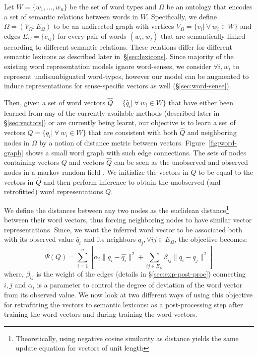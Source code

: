 \documentclass[11pt]{article}
\begin{document}
Let $W = \{w_1,...,w_n\}$ be the set of word types and $\Omega$ be an ontology that encodes a set of semantic relations between words in $W$. 
Specifically, we define $\Omega = (V_\Omega,E_\Omega)$ to be an undirected graph with vertices $V_\Omega = \{v_i | \  \forall \  w_i \in W\}$ and 
edges $E_\Omega = \{e_{ij}\}$ for every pair of words $(w_i,w_j)$ that are semantically linked according to different semantic relations. These relations differ for different semantic lexicons as described later in~\S\ref{sec:lexicons}.
Since majority of the existing word representation models ignore word-senses,
we consider $\forall i, w_i$ to represent undisambiguated word-types, however our model
can be augmented to induce representations for sense-specific vectors as well (\S\ref{sec:word-sense}).

Then, given a set of word vectors $\hat{Q} = \{\hat{q}_i | \  \forall \  w_i \in W\}$ that have 
either been learned from any of the currently available
methods (described later in \S\ref{sec:vectors}) or are currently being learnt, 
our objective is to learn a set of vectors $Q = \{q_i | \  \forall \  w_i \in W\}$ that are 
consistent with both $\hat{Q}$ and neighboring nodes in $\Omega$ by a notion of 
distance metric between vectors. 
Figure~\ref{fig:word-graph} shows a small word graph with such edge 
connections. The sets of nodes containing vectors $Q$ and vectors $\hat{Q}$ 
can be seen as the unobserved and observed nodes in a markov random field 
\cite{kindermann80mrf}. We initialize the vectors in $Q$ to be equal to the vectors in $\hat{Q}$
and then perform inference to obtain the unobserved (and retrofitted) word representations $Q$.

We define the distances between any two nodes as the euclidean distance\footnote{Theoretically, using negative cosine similarity as distance yields the same update equation for vectors of unit length}
 between their word vectors, thus forcing 
neighboring nodes to have similar vector representations. Since, we want the inferred word vector to be
associated both with its observed value $\hat{q}_i$ and its neighbors 
$q_j, \forall ij \in E_{\Omega}$, the objective becomes:
\begin{equation}
  \label{equ:eucl}
  \displaystyle \Psi(Q) = \sum_{i=1}^n \left[ \alpha_i \lVert q_i - \hat{q_i} \rVert^2 + \sum_{ij \in E_{\Omega}} \beta_{ij} \lVert q_i - q_j \rVert^2 \right]
\end{equation}
where, $\beta_{ij}$ is the weight of the edges (details in \S\ref{sec:exp-post-proc}) 
connecting $i,j$ and $\alpha_i$ is a parameter to control the degree of deviation of the word 
vector from its observed value. We now look at two different ways of 
using this objective for retrofitting the vectors to semantic lexicons:
as a post-processing step after training the word vectors and during training the word vectors.
\end{document}
